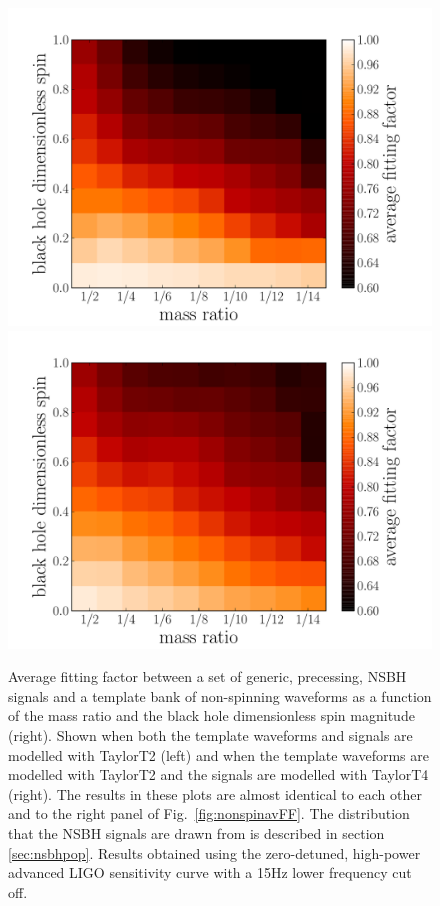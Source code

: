 \begin{figure}
    \centering
    \begin{minipage}[l]{\columnwidth}
    \centering
\includegraphics[width=1.0\textwidth]
{papers/nsbh_effectualness/figure9A.pdf}
\includegraphics[width=1.0\textwidth]
{papers/nsbh_effectualness/figure9B.pdf}
\caption{\label{fig:nonspinavFFT2}
Average fitting factor between a set of generic, precessing, NSBH signals and a
template bank of non-spinning waveforms as a function of the mass ratio and the
black hole dimensionless spin
magnitude (right). Shown when both the
template waveforms and signals are modelled with TaylorT2 (left) and when the
template waveforms are modelled with TaylorT2 and the signals are modelled with
TaylorT4 (right). The results in these plots are almost identical to each other 
and to the right panel of Fig.~\ref{fig:nonspinavFF}.
The distribution that the NSBH
signals are drawn from is described in section \ref{sec:nsbhpop}.
Results obtained
using the zero-detuned, high-power advanced LIGO sensitivity curve with a 15Hz
lower frequency cut off.
}
\end{minipage}
\end{figure}

